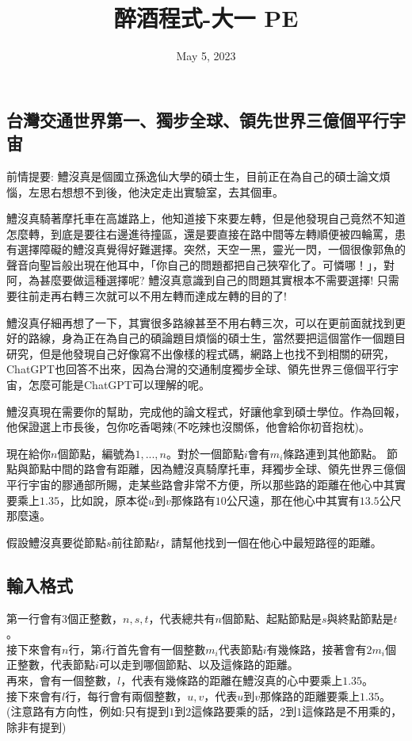 \documentclass{article}
\title{醉酒程式-大一 PE}
\date{May 5, 2023}
\begin{document}
\begin{CJK*}{UTF8}{bsmi}

\maketitle

\section*{台灣交通世界第一、獨步全球、領先世界三億個平行宇宙}

前情提要: 鱧沒真是個國立孫逸仙大學的碩士生，目前正在為自己的碩士論文煩惱，左思右想想不到後，他決定走出實驗室，去其個車。

鱧沒真騎著摩托車在高雄路上，他知道接下來要左轉，但是他發現自己竟然不知道怎麼轉，到底是要往右邊進待撞區，還是要直接在路中間等左轉順便被四輪罵，患有選擇障礙的鱧沒真覺得好難選擇。突然，天空一黑，靈光一閃，一個很像郭魚的聲音向聖旨般出現在他耳中，「你自己的問題都把自己狹窄化了。可憐哪！」，對阿，為甚麼要做這種選擇呢? 鱧沒真意識到自己的問題其實根本不需要選擇! 只需要往前走再右轉三次就可以不用左轉而達成左轉的目的了!

鱧沒真仔細再想了一下，其實很多路線甚至不用右轉三次，可以在更前面就找到更好的路線，身為正在為自己的碩論題目煩惱的碩士生，當然要把這個當作一個題目研究，但是他發現自己好像寫不出像樣的程式碼，網路上也找不到相關的研究，ChatGPT也回答不出來，因為台灣的交通制度獨步全球、領先世界三億個平行宇宙，怎麼可能是ChatGPT可以理解的呢。

鱧沒真現在需要你的幫助，完成他的論文程式，好讓他拿到碩士學位。作為回報，他保證選上市長後，包你吃香喝辣(不吃辣也沒關係，他會給你初音抱枕)。

現在給你$n$個節點，編號為$1,...,n$。對於一個節點$i$會有$m_i$條路連到其他節點。
節點與節點中間的路會有距離，因為鱧沒真騎摩托車，拜獨步全球、領先世界三億個平行宇宙的膠通部所賜，走某些路會非常不方便，所以那些路的距離在他心中其實要乘上$1.35$，比如說，原本從$u$到$v$那條路有$10$公尺遠，那在他心中其實有$13.5$公尺那麼遠。

假設鱧沒真要從節點$s$前往節點$t$，請幫他找到一個在他心中最短路徑的距離。

\subsection*{輸入格式}
第一行會有$3$個正整數，$n,s,t$，代表總共有$n$個節點、起點節點是$s$與終點節點是$t$。\\
接下來會有$n$行，第$i$行首先會有一個整數$m_i$代表節點$i$有幾條路，接著會有$2m_i$個正整數，代表節點$i$可以走到哪個節點、以及這條路的距離。\\
再來，會有一個整數，$l$，代表有幾條路的距離在鱧沒真的心中要乘上$1.35$。\\
接下來會有$l$行，每行會有兩個整數，$u,v$，代表$u$到$v$那條路的距離要乘上$1.35$。(注意路有方向性，例如:只有提到$1$到$2$這條路要乘的話，$2$到$1$這條路是不用乘的，除非有提到)


\end{CJK*}
\end{document}
